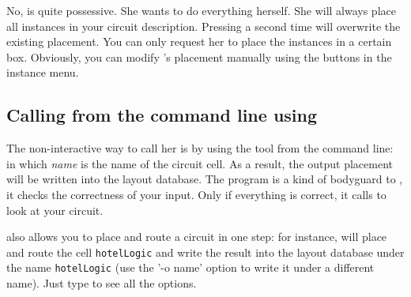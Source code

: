 {No,  is quite possessive. She wants to do everything herself.
She will always place all instances in your circuit description.
Pressing  a second time will overwrite the
existing placement.
You can only request her to place the instances in a certain box.
Obviously, you can modify 's placement manually using the
buttons in the instance menu.}

\subsection{Calling \protect{} from the command line using \protect{}}
\label{m-sea}
The non-interactive way to call her is by using the tool  from the
command line:  in which {\sl name} is the name of the
circuit cell.
As a result,
the output placement will be written into the layout database.
The program  is a kind of bodyguard to ,
it checks the correctness of your input.
Only if everything is correct,
it calls  to look at your circuit. 

 also allows you to place and route a circuit in one step:
for instance, will place and route the cell {\tt hotelLogic} and write the
result into the layout database under the name {\tt hotelLogic} (use the '-o
name' option to write it under a different name).
Just type  to see all the options.  

\cleardoublepage
